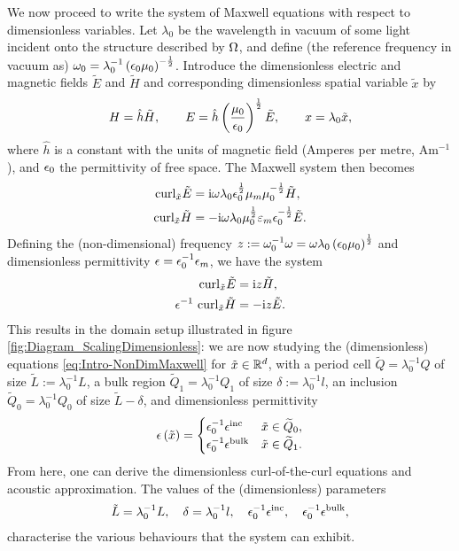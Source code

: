 We now proceed to write the system of Maxwell equations with respect to dimensionless variables.
Let $\lambda_0$ be the wavelength in vacuum of some light incident onto the structure described by $\Omega$, and define (the reference frequency in vacuum as) $\omega_0 = \lambda_0^{-1}\left( \epsilon_0\mu_0 \right)^{-\frac{1}{2}}$.
Introduce the dimensionless electric and magnetic fields $\tilde{E}$ and $\tilde{H}$ and corresponding dimensionless spatial variable $\tilde{x}$ by
\begin{align*}
	H = \hat{h}\tilde{H}, 
	\qquad E = \hat{h}\left( \frac{\mu_0}{\epsilon_0} \right)^{\frac{1}{2}}\tilde{E},
	\qquad x = \lambda_0\tilde{x},
\end{align*}
where $\hat{h}$ is a constant with the units of magnetic field (Amperes per metre, $\mathrm{A}\mathrm{m}^{-1}$), and $\epsilon_0$ the permittivity of free space.
The Maxwell system then becomes
\begin{align*}
	\mathrm{curl}_{\tilde{x}}\tilde{E} 
	&= \mathrm{i}\omega\lambda_0\epsilon_0^{\frac{1}{2}}\mu_m\mu_0^{-\frac{1}{2}} \tilde{H}, \\
	\mathrm{curl}_{\tilde{x}}\tilde{H} 
	&= -\mathrm{i}\omega\lambda_0\mu_0^{\frac{1}{2}}\varepsilon_m\epsilon_0^{-\frac{1}{2}} \tilde{E}.
\end{align*}
Defining the (non-dimensional) frequency $z := \omega_0^{-1}\omega = \omega\lambda_0\left( \epsilon_0\mu_0 \right)^{\frac{1}{2}}$ and dimensionless permittivity $\epsilon=\epsilon_0^{-1}\epsilon_m$, we have the system
\begin{align} \label{eq:Intro-NonDimMaxwell}
	\mathrm{curl}_{\tilde{x}}\tilde{E} 
	&= \mathrm{i} z \tilde{H}, \\
	\epsilon^{-1} \ \mathrm{curl}_{\tilde{x}}\tilde{H} 
	&= -\mathrm{i} z \tilde{E}.
\end{align}
This results in the domain setup illustrated in figure \ref{fig:Diagram_ScalingDimensionless}: we are now studying the (dimensionless) equations \eqref{eq:Intro-NonDimMaxwell} for $\tilde{x}\in\mathbb{R}^d$, with a period cell $\widetilde{Q} = \lambda_0^{-1}Q$ of size $\tilde{L}:=\lambda_0^{-1}L$, a bulk region $\widetilde{Q}_1 = \lambda_0^{-1}Q_1$ of size $\delta:=\lambda_0^{-1}l$, an inclusion $\widetilde{Q}_0 = \lambda_0^{-1}Q_0$ of size $\tilde{L}-\delta$, and dimensionless permittivity
\begin{align*}
	\epsilon\left( \tilde{x} \right) = 
	\begin{cases} 
		\epsilon_0^{-1}\epsilon^{\mathrm{inc}} & \tilde{x}\in\widetilde{Q}_0, \\
		\epsilon_0^{-1}\epsilon^{\mathrm{bulk}} & \tilde{x}\in\widetilde{Q}_1.
	\end{cases}
\end{align*}
From here, one can derive the dimensionless curl-of-the-curl equations and acoustic approximation.
The values of the (dimensionless) parameters
\begin{align*}
	\tilde{L} = \lambda_0^{-1}L, \quad
	\delta = \lambda_0^{-1}l, \quad
	\epsilon_0^{-1}\epsilon^{\mathrm{inc}}, \quad
	\epsilon_0^{-1}\epsilon^{\mathrm{bulk}},
\end{align*}
characterise the various behaviours that the system can exhibit.

